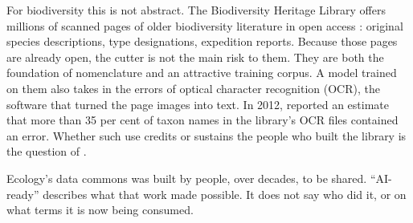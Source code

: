 For biodiversity this is not abstract. The Biodiversity Heritage Library offers
millions of scanned pages of older biodiversity literature in open access
\parencite{nguyen2019copious}: original species descriptions, type
designations, expedition reports. Because those pages are already open, the
cutter is not the main risk to them. They are both the foundation of
nomenclature and an attractive training corpus. A model trained on them also
takes in the errors of optical character recognition (OCR), the software that
turned the page images into text. In 2012, \textcite{thessen2012nlp} reported
an estimate that more than 35 per cent of taxon names in the library's OCR
files contained an error. Whether such use credits or sustains the people who
built the library is the question of .

\begin{keypoint}
Ecology's data commons was built by people, over decades, to be shared.
``AI-ready'' describes what that work made possible. It does not say who did it,
or on what terms it is now being consumed.
\end{keypoint}
